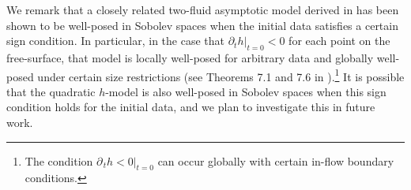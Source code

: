 \documentclass[11pt]{article}
\theoremstyle{plain}
\theoremstyle{definition}
\theoremstyle{definition}
\def\p{\text{\bf\emph{p}}}
\def\p{{\partial\hspace{1pt}}}
\begin{document}
We remark that  a closely  related two-fluid asymptotic model  derived in \cite{GrSh2017} has been shown to be well-posed in Sobolev spaces when
the initial data satisfies a certain sign condition.   In particular, in the case that $ \partial_t h|_{t=0} <0$ for each point on the free-surface, that model is locally well-posed for arbitrary data 
and globally well-posed under certain size restrictions (see   Theorems 7.1 and 7.6  in \cite{GrSh2017}).\footnote{The condition $\p_t h <0|_{t=0}$ can occur
globally  with certain
in-flow boundary conditions.} 
  It is possible that the quadratic $h$-model is also well-posed in Sobolev spaces when this sign condition holds for the initial data, and we plan to investigate this
  in future work.




  
\end{document}
